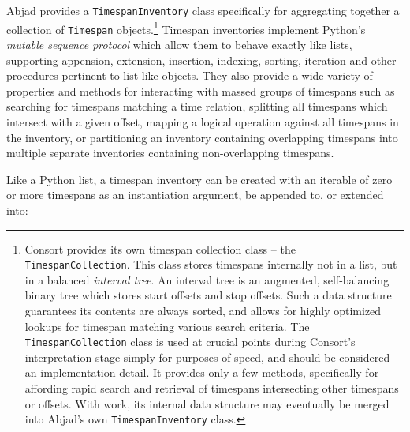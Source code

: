 Abjad provides a \texttt{TimespanInventory} class specifically for aggregating
together a collection of \texttt{Timespan} objects.\footnote{ Consort provides
its own timespan collection class -- the \texttt{TimespanCollection}. This
class stores timespans internally not in a list, but in a balanced
\emph{interval tree}.\cite{cormen2009introduction} An interval tree is an
augmented, self-balancing binary tree which stores start offsets and stop
offsets. Such a data structure guarantees its contents are always sorted, and
allows for highly optimized lookups for timespan matching various search
criteria. The \texttt{TimespanCollection} class is used at crucial points
during Consort's interpretation stage simply for purposes of speed, and should
be considered an implementation detail. It provides only a few methods,
specifically for affording rapid search and retrieval of timespans intersecting
other timespans or offsets. With work, its internal data structure may
eventually be merged into Abjad's own \texttt{TimespanInventory} class.}
Timespan inventories implement Python's \emph{mutable sequence protocol} which
allow them to behave exactly like lists, supporting appension, extension,
insertion, indexing, sorting, iteration and other procedures pertinent to
list-like objects. They also provide a wide variety of properties and methods
for interacting with massed groups of timespans such as searching for timespans
matching a time relation, splitting all timespans which intersect with a given
offset, mapping a logical operation against all timespans in the inventory, or
partitioning an inventory containing overlapping timespans into multiple
separate inventories containing non-overlapping timespans.

Like a Python list, a timespan inventory can be created with an iterable of
zero or more timespans as an instantiation argument, be appended to, or
extended into:

\begin{comment}
<abjad>
timespan_inventory = timespantools.TimespanInventory([
    timespantools.Timespan(0, 16),
    ])
timespan_inventory.append(timespantools.Timespan(5, 12))
timespan_inventory.extend([
    timespantools.Timespan(-2, 8),
    timespantools.Timespan(15, 20),
    ])
print(format(timespan_inventory))
show(timespan_inventory)
</abjad>
\end{comment}

